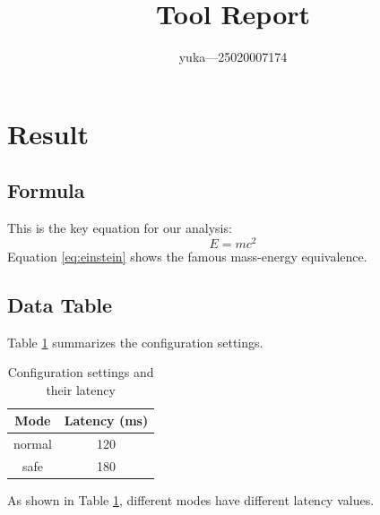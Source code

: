 \documentclass{article}
\begin{document}
\title{Tool Report}
\author{yuka—25020007174}
\maketitle

\section{Result}

\subsection{Formula}
This is the key equation for our analysis:
\begin{equation}
E = mc^2 \label{eq:einstein}
\end{equation}
Equation \eqref{eq:einstein} shows the famous mass-energy equivalence.

\subsection{Data Table}
Table \ref{tab:config} summarizes the configuration settings.

\begin{table}[h]
\centering
\begin{tabular}{|c|c|}
\hline
Mode & Latency (ms) \\
\hline
normal & 120 \\
safe & 180 \\
\hline
\end{tabular}
\caption{Configuration settings and their latency}
\label{tab:config}
\end{table}

As shown in Table \ref{tab:config}, different modes have different latency values.
\end{document}
